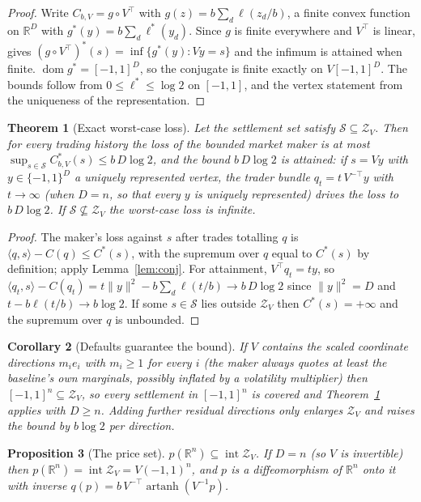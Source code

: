 \documentclass[11pt]{article}
\newtheorem{theorem}{Theorem}[section]
\newtheorem{proposition}[theorem]{Proposition}
\newtheorem{corollary}[theorem]{Corollary}
\theoremstyle{definition}
\theoremstyle{remark}
\newcommand{\R}{\mathbb{R}}
\newcommand{\ip}[2]{\langle #1,#2\rangle}
\newcommand{\lc}{\ell}
\newcommand{\lcs}{\ell^{*}}
\newcommand{\dom}{\operatorname{dom}}
\newcommand{\artanh}{\operatorname{artanh}}
\newcommand{\inter}{\operatorname{int}}
\newcommand{\zono}{\mathcal{Z}}
\begin{document}
\begin{proof}
Write $C_{b,V}=g\circ V^{\top}$ with $g(z)=b\sum_d\lc(z_d/b)$, a finite convex function on $\R^{D}$ with
$g^{*}(y)=b\sum_d\lcs(y_d)$. Since $g$ is finite everywhere and $V^{\top}$ is linear, \citet[Thm.\ 16.3]{rockafellar1970}
gives $(g\circ V^{\top})^{*}(s)=\inf\{g^{*}(y):Vy=s\}$ and the infimum is attained when finite. $\dom g^{*}=[-1,1]^{D}$,
so the conjugate is finite exactly on $V[-1,1]^{D}$. The bounds follow from $0\le\lcs\le\log2$ on $[-1,1]$, and the
vertex statement from the uniqueness of the representation.
\end{proof}

\begin{theorem}[Exact worst-case loss]\label{thm:loss}
Let the settlement set satisfy $\mathcal{S}\subseteq\zono_V$. Then for every trading history the loss of the bounded
market maker is at most $\sup_{s\in\mathcal{S}}C_{b,V}^{*}(s)\le b\,D\log 2$, and the bound $b\,D\log2$ is attained:
if $s=Vy$ with $y\in\{-1,1\}^{D}$ a uniquely represented vertex, the trader bundle $q_t=t\,V^{-\top}y$ with
$t\to\infty$ (when $D=n$, so that every $y$ is uniquely represented) drives the loss to $b\,D\log2$. If $\mathcal{S}\not\subseteq\zono_V$ the worst-case
loss is infinite.
\end{theorem}

\begin{proof}
The maker's loss against $s$ after trades totalling $q$ is $\ip{q}{s}-C(q)\le C^{*}(s)$, with the supremum over $q$
equal to $C^{*}(s)$ by definition; apply Lemma~\ref{lem:conj}. For attainment, $V^{\top}q_t=ty$, so
$\ip{q_t}{s}-C(q_t)=t\|y\|^2-b\sum_d\lc(t/b)\to b\,D\log 2$ since $\|y\|^2=D$ and $t-b\lc(t/b)\to b\log2$. If some
$s\in\mathcal{S}$ lies outside $\zono_V$ then $C^{*}(s)=+\infty$ and the supremum over $q$ is unbounded.
\end{proof}

\begin{corollary}[Defaults guarantee the bound]\label{cor:defaults}
If $V$ contains the scaled coordinate directions $m_ie_i$ with $m_i\ge1$ for every $i$ (the maker always quotes at
least the baseline's own marginals, possibly inflated by a volatility multiplier) then $[-1,1]^{n}\subseteq\zono_V$,
so every settlement in $[-1,1]^{n}$ is covered and Theorem~\ref{thm:loss} applies with $D\ge n$. Adding further
residual directions only enlarges $\zono_V$ and raises the bound by $b\log2$ per direction.
\end{corollary}

\begin{proposition}[The price set]\label{prop:priceset}
$p(\R^{n})\subseteq\inter\zono_V$. If $D=n$ (so $V$ is invertible) then $p(\R^{n})=\inter\zono_V=V(-1,1)^{n}$, and
$p$ is a diffeomorphism of $\R^{n}$ onto it with inverse $q(p)=b\,V^{-\top}\artanh(V^{-1}p)$.
\end{proposition}
\end{document}
